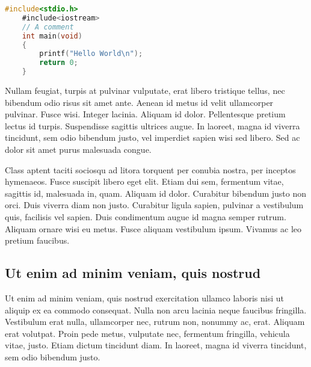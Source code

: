 \begin{lstlisting}[caption={~Zbytečný kód},label=list:8-6,captionpos=t,float,abovecaptionskip=-\medskipamount,belowcaptionskip=\medskipamount,language=C]
    #include<stdio.h>
    #include<iostream>
    // A comment
    int main(void)
    {
        printf("Hello World\n");
        return 0;
    }
\end{lstlisting}

Nullam feugiat, turpis at pulvinar vulputate, erat libero tristique tellus, nec bibendum odio risus sit amet ante. Aenean id metus id velit ullamcorper pulvinar. Fusce wisi. Integer lacinia. Aliquam id dolor. Pellentesque pretium lectus id turpis. Suspendisse sagittis ultrices augue. In laoreet, magna id viverra tincidunt, sem odio bibendum justo, vel imperdiet sapien wisi sed libero. Sed ac dolor sit amet purus malesuada congue. \cite{Crochemore2002}

Class aptent taciti sociosqu ad litora torquent per conubia nostra, per inceptos hymenaeos. Fusce suscipit libero eget elit. Etiam dui sem, fermentum vitae, sagittis id, malesuada in, quam. Aliquam id dolor. Curabitur bibendum justo non orci. Duis viverra diam non justo. Curabitur ligula sapien, pulvinar a vestibulum quis, facilisis vel sapien. Duis condimentum augue id magna semper rutrum. Aliquam ornare wisi eu metus. Fusce aliquam vestibulum ipsum. Vivamus ac leo pretium faucibus. \cite{Motwani2014}

\subsection{Ut enim ad minim veniam, quis nostrud}

Ut enim ad minim veniam, quis nostrud exercitation ullamco laboris nisi ut aliquip ex ea commodo consequat. Nulla non arcu lacinia neque faucibus fringilla. Vestibulum erat nulla, ullamcorper nec, rutrum non, nonummy ac, erat. Aliquam erat volutpat. Proin pede metus, vulputate nec, fermentum fringilla, vehicula vitae, justo. Etiam dictum tincidunt diam. In laoreet, magna id viverra tincidunt, sem odio bibendum justo. \cite{Sestakova2018}


